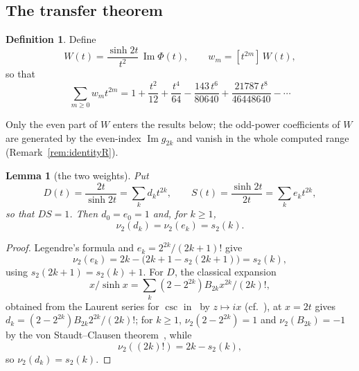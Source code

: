 \documentclass[12pt]{amsart}
\newtheorem{lemma}[theorem]{Lemma}
\theoremstyle{definition}
\newtheorem{definitionx}[theorem]{Definition}
\theoremstyle{remark}
\begin{document}
\subsection{The transfer theorem}

\begin{definitionx}\label{def:W}
Define
\begin{equation}\label{eq:normalform}
  W(t)=\frac{\sinh2t}{t^2}\,\operatorname{Im}\Phi(t),
  \qquad
  w_m=[t^{2m}]\,W(t),
\end{equation}
so that
\[
  \sum_{m\ge0}w_mt^{2m}
  =1+\frac{t^2}{12}+\frac{t^4}{64}-\frac{143\,t^6}{80640}       +\frac{21787\,t^8}{46448640}-\cdots
\]
\end{definitionx}

Only the even part of $W$ enters the results below; the odd-power coefficients of $W$ are generated by the even-index $\operatorname{Im}g_{2k}$ and vanish in the whole computed range (Remark~\ref{rem:identityR}).

\begin{lemma}[the two weights]\label{lem:weights}
Put
\[
D(t)=\frac{2t}{\sinh2t}=\sum_kd_kt^{2k},\qquad S(t)=\frac{\sinh2t}{2t}=\sum_ke_kt^{2k},
\]
so that $DS=1$.  Then $d_0=e_0=1$ and, for $k\ge1$,
\[
  \nu_2(d_k)=\nu_2(e_k)=s_2(k).
\]
\end{lemma}

\begin{proof}
Legendre's formula and $e_k=2^{2k}/(2k+1)!$  give 
\[
\nu_2(e_k)=2k-\bigl(2k+1-s_2(2k+1)\bigr)=s_2(k), 
\]
using $s_2(2k+1)=s_2(k)+1$.  For $D$, the classical expansion 
\[
x/\sinh x=\sum_k(2-2^{2k})B_{2k}x^{2k}/(2k)!, 
\]
obtained from the Laurent series for $\csc$ in~\cite[Eq.~4.19.4]{DLMF} by $z\mapsto ix$ (cf.~\cite[Eqs.~4.28.8--4.28.13 and 24.2.1]{DLMF}), at $x=2t$ gives $d_k=(2-2^{2k})B_{2k}2^{2k}/(2k)!$; for $k\ge1$, $\nu_2(2-2^{2k})=1$ and $\nu_2(B_{2k})=-1$ by the von Staudt--Clausen theorem~\cite{Clausen,Rado,Carlitz}, while 
\[
\nu_2((2k)!)=2k-s_2(k), 
\]
so $\nu_2(d_k)=s_2(k)$.
\end{proof}
\end{document}
